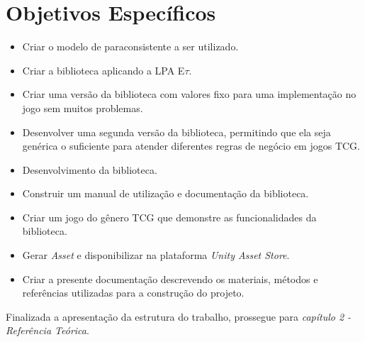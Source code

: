 \section{Objetivos Específicos}
	\begin{itemize}
		\item Criar o modelo de paraconsistente a ser utilizado.
		\item Criar a biblioteca aplicando a LPA E$\tau$.
		\item Criar uma versão da biblioteca com valores fixo para uma implementação no jogo sem muitos problemas.
		\item Desenvolver uma segunda versão da biblioteca, permitindo que ela seja genérica o suficiente para atender diferentes regras de negócio em jogos TCG.
		\item Desenvolvimento da biblioteca.
		\item Construir um manual de utilização e documentação da biblioteca.
		\item Criar um jogo do gênero TCG que demonstre as funcionalidades da biblioteca.
		\item Gerar \textit{Asset} e disponibilizar na plataforma \textit{Unity Asset Store}.
		\item Criar a presente documentação descrevendo os materiais, métodos e referências utilizadas para a construção do projeto.
	\end{itemize}

	
Finalizada a apresentação da estrutura do trabalho, prossegue para \textit{capítulo 2 - Referência Teórica}.
